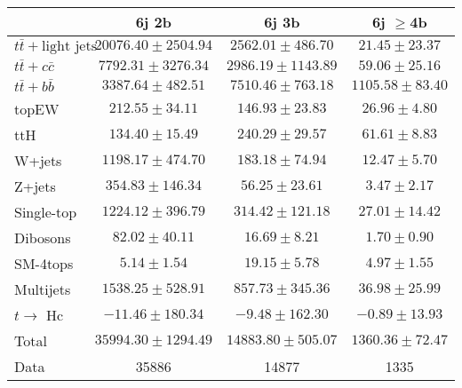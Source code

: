 \begin{table}
\begin{center}
  \begin{tabular}{ | l |  c |  c |  c | }
    \hline \hline 
     & 6j 2b  & 6j 3b  & 6j $\geq$4b  \\ 
    \hline 
     $t\bar{t}+\text{light jets}$  &   $ 20076.40 \pm 2504.94 $ &   $ 2562.01 \pm 486.70 $ &   $ 21.45 \pm 23.37 $ \\ 
     $t\bar{t}+c\bar{c}$  &   $ 7792.31 \pm 3276.34 $ &   $ 2986.19 \pm 1143.89 $ &   $ 59.06 \pm 25.16 $ \\ 
     $t\bar{t}+b\bar{b}$  &   $ 3387.64 \pm 482.51 $ &   $ 7510.46 \pm 763.18 $ &   $ 1105.58 \pm 83.40 $ \\ 
    topEW  &   $ 212.55 \pm 34.11 $ &   $ 146.93 \pm 23.83 $ &   $ 26.96 \pm 4.80 $ \\ 
    ttH  &   $ 134.40 \pm 15.49 $ &   $ 240.29 \pm 29.57 $ &   $ 61.61 \pm 8.83 $ \\ 
    W+jets  &   $ 1198.17 \pm 474.70 $ &   $ 183.18 \pm 74.94 $ &   $ 12.47 \pm 5.70 $ \\ 
    Z+jets  &   $ 354.83 \pm 146.34 $ &   $ 56.25 \pm 23.61 $ &   $ 3.47 \pm 2.17 $ \\ 
    Single-top  &   $ 1224.12 \pm 396.79 $ &   $ 314.42 \pm 121.18 $ &   $ 27.01 \pm 14.42 $ \\ 
    Dibosons  &   $ 82.02 \pm 40.11 $ &   $ 16.69 \pm 8.21 $ &   $ 1.70 \pm 0.90 $ \\ 
    SM-4tops  &   $ 5.14 \pm 1.54 $ &   $ 19.15 \pm 5.78 $ &   $ 4.97 \pm 1.55 $ \\ 
    Multijets  &   $ 1538.25 \pm 528.91 $ &   $ 857.73 \pm 345.36 $ &   $ 36.98 \pm 25.99 $ \\ 
     $t\rightarrow$ Hc  &   $ -11.46 \pm 180.34 $ &   $ -9.48 \pm 162.30 $ &   $ -0.89 \pm 13.93 $ \\ 
    Total  &   $ 35994.30 \pm 1294.49 $ &   $ 14883.80 \pm 505.07 $ &   $ 1360.36 \pm 72.47 $ \\ 
    \hline 
    Data  & 35886  & 14877  & 1335  \\ 
    \hline \hline 
  \end{tabular} 


\end{center}
\end{table}
